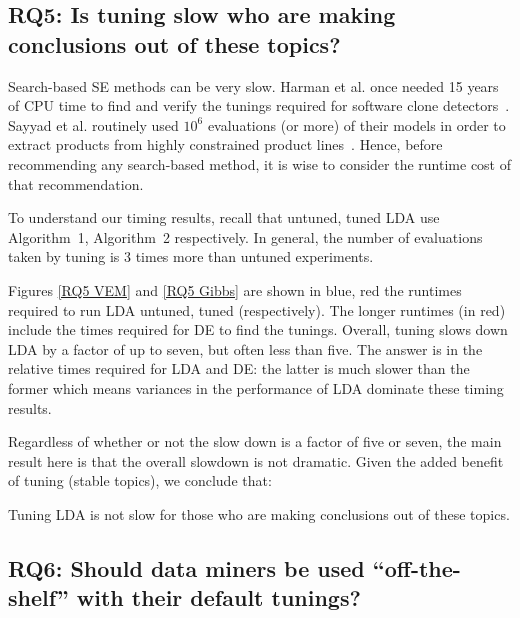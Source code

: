 \documentclass[10pt,conference]{IEEEtran}
\theoremstyle{break}
\begin{document}
\subsection{\textbf{RQ5: Is tuning slow who are making conclusions out of these topics?}}

Search-based SE methods can be very slow. Harman et al. once needed 15
years of CPU time to find and verify the tunings required for software
clone detectors~\cite{wang2013searching}. Sayyad et al. routinely used
$10^6$ evaluations (or more) of their models in order to extract
products from highly constrained product
lines~\cite{sayyad2013scalable}. Hence, before recommending any
search-based method, it is wise to consider the runtime cost of that
recommendation.


To understand our timing results, recall that untuned, tuned LDA use
Algorithm~1, Algorithm~2 respectively. In general, the number of evaluations taken by tuning is 3 times more than 
untuned experiments.


  Figures \ref{RQ5 VEM} and \ref{RQ5 Gibbs} are shown in blue, red the
  runtimes required to run LDA untuned, tuned (respectively).  The
  longer runtimes (in red) include the times required for DE to find
  the tunings. Overall, tuning slows down LDA by a factor of up to
  seven, but often less than five. The answer is in the relative times required for LDA and DE: the latter is much slower
  than the former which means variances in the performance of LDA dominate these timing results.

  Regardless of whether or not the slow down is a factor of five or seven,
  the main result here is that
  the overall slowdown is not dramatic. Given the added benefit of tuning (stable topics),
  we conclude that:

  \begin{lesson}
    Tuning LDA is not slow for those who are making conclusions out of these topics.
\end{lesson}

\subsection{\textbf{RQ6: Should data miners be used “off-the-shelf” with their default tunings?}}
\end{document}
